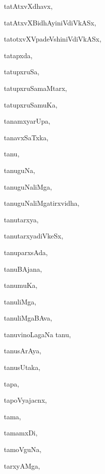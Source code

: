 \begin{multicols}{3}
{\noindent
{tatAtxvXdhavx}, \pageref{tatAtxvXdhavx}

\noindent
{tatAtxvXBidhAyiniVdiVkASx}, \pageref{tatAtxvXBidhAyiniVdiVkASx}

\noindent
{tatotxvXVpadeVshiniVdiVkASx}, \pageref{tatotxvXVpadeVshiniVdiVkASx}

\noindent
{tatapxda}, \pageref{tatapxda}

\noindent
{tatupxruSa}, \pageref{tatupxruSa}

\noindent
{tatupxruSamaMtarx}, \pageref{tatupxruSamaMtarx}

\noindent
{tatupxruSamuKa}, \pageref{tatupxruSamuKa}

\noindent
{tanamxyarUpa}, \pageref{tanamxyarUpa}

\noindent
{tanavxSaTxka}, \pageref{tanavxSaTxka}

\noindent
{tanu}, \pageref{tanu}

\noindent
{tanuguNa}, \pageref{tanuguNa}

\noindent
{tanuguNaliMga}, \pageref{tanuguNaliMga}

\noindent
{tanuguNaliMgatirxvidha}, \pageref{tanuguNaliMgatirxvidha}

\noindent
{tanutarxya}, \pageref{tanutarxya}

\noindent
{tanutarxyadiVkeSx}, \pageref{tanutarxyadiVkeSx}

\noindent
{tanuparxsAda}, \pageref{tanuparxsAda}

\noindent
{tanuBAjana}, \pageref{tanuBAjana}

\noindent
{tanumuKa}, \pageref{tanumuKa}

\noindent
{tanuliMga}, \pageref{tanuliMga}

\noindent
{tanuliMgaBAva}, \pageref{tanuliMgaBAva}

\noindent
{tanuvinoLagaNa tanu}, \pageref{tanuvinoLagaNa tanu}

\noindent
{tanusArAya}, \pageref{tanusArAya}

\noindent
{tanusUtaka}, \pageref{tanusUtaka}

\noindent
{tapa}, \pageref{tapa}

\noindent
{tapoVyajacnx}, \pageref{tapoVyajacnx}

\noindent
{tama}, \pageref{tama}

\noindent
{tamamxDi}, \pageref{tamamxDi}

\noindent
{tamoVguNa}, \pageref{tamoVguNa}

\noindent
{tarxyAMga}, \pageref{tarxyAMga}

}
\end{multicols}

